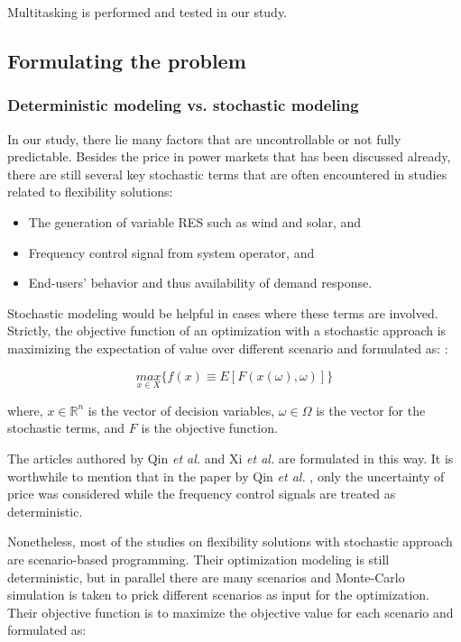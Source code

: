 Multitasking is performed and tested in our study.

\subsection{Formulating the problem}
\label{sec:formulating-solving}

\subsubsection{Deterministic modeling vs. stochastic modeling}
In our study, there lie many factors that are uncontrollable or not fully predictable. Besides the price in power markets that has been discussed already, there are still several key stochastic terms that are often encountered in studies related to flexibility solutions: 

\begin{itemize}
	\item The generation of variable RES such as wind and solar, and
	\item Frequency control signal from system operator, and
	\item End-users' behavior and thus availability of demand response.
\end{itemize}

Stochastic modeling would be helpful in cases where these terms are involved. Strictly, the objective function of an optimization with a stochastic approach is maximizing the expectation of value over different scenario and formulated as:  \cite{Zucker2013}:

\begin{equation*}
	\underset{x\in X}{max}\{ f(x) \equiv E[F(x(\omega),\omega) ] \}
\end{equation*}
 
where, $x \in \mathbb{R}^n$ is the vector of decision variables, $\omega \in  \Omega$ is the vector for the stochastic terms, and $F$ is the objective function. 

The articles authored by Qin \textit{et al.} \cite{Qin2012} and Xi \textit{et al.} \cite{Xi2014} are formulated in this way. It is worthwhile to mention that in the paper by Qin \textit{et al.} \cite{Qin2012}, only the uncertainty of price was considered while the frequency control signals are treated as deterministic. 

Nonetheless, most of the studies on flexibility solutions with stochastic approach are scenario-based programming. Their optimization modeling is still deterministic, but in parallel there are many scenarios and Monte-Carlo simulation is taken to prick different scenarios as input for the optimization. Their objective function is to maximize the objective value for each scenario and formulated as:

